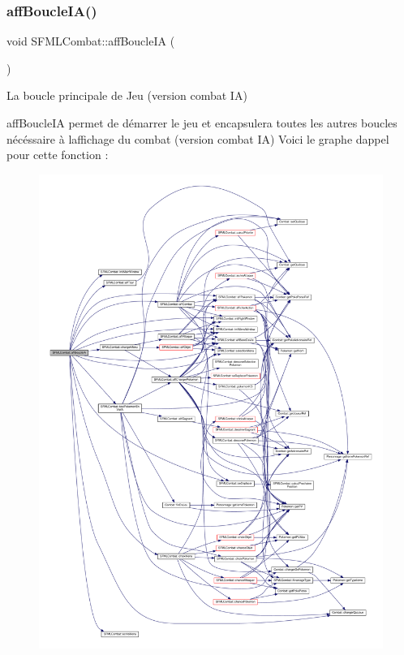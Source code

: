 \subsubsection{\texorpdfstring{aff\+Boucle\+I\+A()}{affBoucleIA()}}
{\footnotesize\ttfamily void S\+F\+M\+L\+Combat\+::aff\+Boucle\+IA (\begin{DoxyParamCaption}{ }\end{DoxyParamCaption})}



La boucle principale de Jeu (version combat IA) 

aff\+Boucle\+IA permet de démarrer le jeu et encapsulera toutes les autres boucles nécéssaire à l\textquotesingle{}affichage du combat (version combat IA) Voici le graphe d\textquotesingle{}appel pour cette fonction \+:\nopagebreak
\begin{figure}[H]
\begin{center}
\leavevmode
\includegraphics[width=350pt]{class_s_f_m_l_combat_a116d70985530e3c46e5b60adc910a1fb_cgraph}
\end{center}
\end{figure}
\mbox{\label{class_s_f_m_l_combat_ab8d4dfb3e7e4ca9722e52c1ef5fa897d}} 
